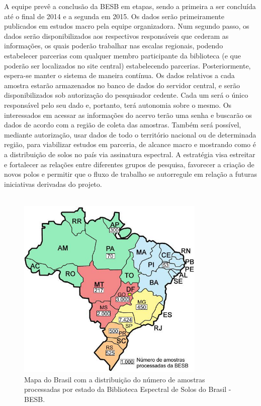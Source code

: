 A equipe prevê a conclusão da BESB em etapas, sendo a primeira a ser concluída até o final de 2014 e a segunda em 2015. Os dados serão primeiramente publicados em estudos macro pela equipe organizadora. Num segundo passo, os dados serão disponibilizados aos respectivos responsáveis que cederam as informações, os quais poderão trabalhar nas escalas regionais, podendo estabelecer parcerias com qualquer membro participante da biblioteca (e que poderão ser localizados no site central) estabelecendo parcerias. Posteriormente, espera-se manter o sistema de maneira contínua. Os dados relativos a cada amostra estarão armazenados no banco de dados do servidor central, e serão disponibilizados sob autorização do pesquisador cedente. Cada um será o único responsável pelo seu dado e, portanto, terá autonomia sobre o mesmo. Os interessados em acessar as informações do acervo terão uma senha e buscarão os dados de acordo com a região de coleta das amostras. Também será possível, mediante autorização, usar dados de todo o território nacional ou de determinada região, para viabilizar estudos em parceria, de alcance macro e mostrando como é a distribuição de solos no país via assinatura espectral. A estratégia visa estreitar e fortalecer as relações entre diferentes grupos de pesquisa, favorecer a criação de novos polos e permitir que o fluxo de trabalho se autorregule em relação a futuras iniciativas derivadas do projeto.\\
\\
\begin{figure}
   \centering
   \includegraphics[width=0.8\textwidth]{figuras/brasil.jpg}
   \caption{Mapa do Brasil com a distribuição do número de amostras processadas por estado da Biblioteca Espectral de Solos do Brasil - BESB.}
   \label{fig:brasil}
\end{figure}

